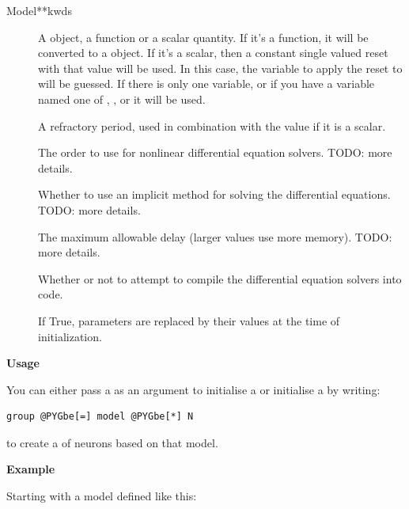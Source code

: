 \documentclass[letterpaper,10pt]{manual}
\begin{document}
\begin{classdesc}{Model}{**kwds}
\begin{description}
\item[]
A \hyperlink{brian.Reset}{} object, a function or a scalar quantity. If it's a
function, it will be converted to a \hyperlink{brian.FunReset}{} object. If it's
a scalar, then a constant single valued reset with that value will
be used. In this case,
the variable to apply the reset to will be guessed. If there is
only one variable, or if you have a variable named one of
, ,  or  it will be used.

\item[]
A refractory period, used in combination with the  value
if it is a scalar.

\item[]
The order to use for nonlinear differential equation solvers.
TODO: more details.

\item[]
Whether to use an implicit method for solving the differential
equations. TODO: more details.

\item[]
The maximum allowable delay (larger values use more memory).
TODO: more details.

\item[]
Whether or not to attempt to compile the differential equation
solvers into  code.

\item[]
If True, parameters are replaced by their values at the time
of initialization.

\end{description}

\textbf{Usage}

You can either pass a \hyperlink{brian.Model}{} as an argument to initialise a
\hyperlink{brian.NeuronGroup}{} or initialise a \hyperlink{brian.NeuronGroup}{} by writing:

\begin{Verbatim}[commandchars=@\[\]]
group @PYGbe[=] model @PYGbe[*] N
\end{Verbatim}

to create a \hyperlink{brian.NeuronGroup}{} of  neurons based on that model.

\textbf{Example}

Starting with a model defined like this:


\end{classdesc}
\end{document}
